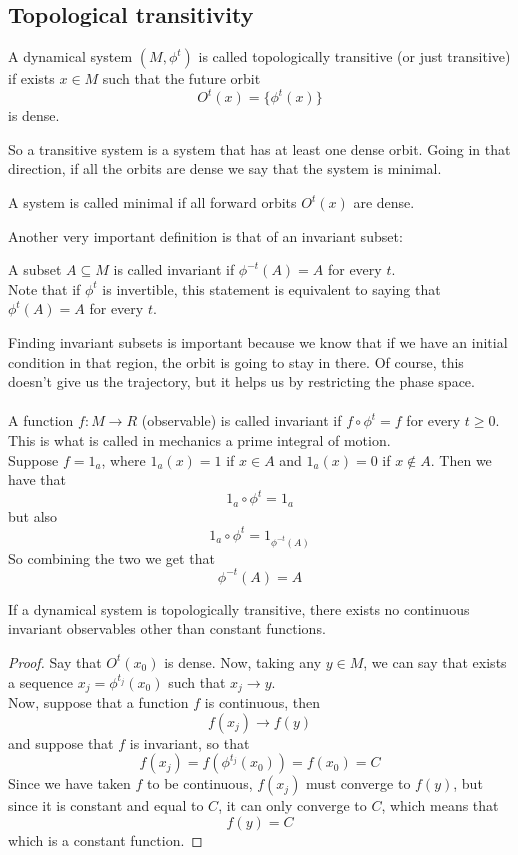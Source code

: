 \subsection{Topological transitivity}
\begin{definition}
	A dynamical system $(M,\phi^t)$ is called topologically transitive (or just transitive) if exists $x\in M$ such that the future orbit
	$$
		O^t(x) = \{\phi^t(x)\}
	$$
	is dense.
\end{definition}
So a transitive system is a system that has at least one dense orbit. Going in that direction, if all the orbits are dense we say that the system is minimal.
\begin{definition}
	A system is called minimal if all forward orbits $O^t(x)$ are dense. 
\end{definition}
Another very important definition is that of an invariant subset:
\begin{definition}
	A subset $A \subseteq M$ is called invariant if $\phi^{-t}(A) = A$ for every $t$. \\
	Note that if $\phi^t$ is invertible, this statement is equivalent to saying that $\phi^t(A) = A$ for every $t$.
\end{definition}
Finding invariant subsets is important because we know that if we have an initial condition in that region, the orbit is going to stay in there. Of course, this doesn't give us the trajectory, but it helps us by restricting the phase space. \\ \\
A function $f:M\rightarrow R$ (observable) is called invariant if $f\circ\phi^t = f$ for every $t \geq 0$. This is what is called in mechanics a prime integral of motion. \\
Suppose $f = 1_a$, where $1_a(x) = 1$ if $x\in A$ and $1_a(x) = 0$ if $x \notin A$. Then we have that
$$
	1_a \circ \phi^t = 1_a
$$
but also 
$$
	1_a \circ \phi^t = 1_{\phi^{-t}(A)}
$$
So combining the two we get that 
$$
	\phi^{-t}(A) = A
$$
\begin{prop}
	If a dynamical system is topologically transitive, there exists no continuous invariant observables other than constant functions.
\end{prop}
\begin{proof}
	Say that $O^t(x_0)$ is dense. Now, taking any $y \in M$, we can say that exists a sequence $x_j = \phi^{t_j}(x_0)$ such that $x_j \longrightarrow y$. \\
	Now, suppose that a function $f$ is continuous, then
	$$
		f(x_j) \longrightarrow f(y)
	$$
	and suppose that $f$ is invariant, so that
	$$
		f(x_j) = f(\phi^{t_j}(x_0)) = f(x_0) = C
	$$
	Since we have taken $f$ to be continuous, $f(x_j)$ must converge to $f(y)$, but since it is constant and equal to $C$, it can only converge to $C$, which means that
	$$
		f(y) = C
	$$
	which is a constant function.
\end{proof}
